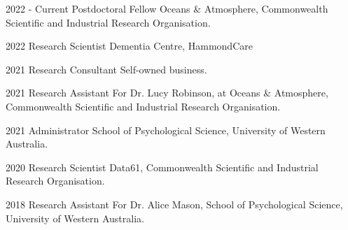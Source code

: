 

\begin{cvskills}
  \cvskill
    {2022 - Current} %
    {Postdoctoral Fellow} %
    {Oceans \& Atmosphere, Commonwealth Scientific and Industrial Research Organisation.} %

  \cvskill
    {2022} %
    {Research Scientist} %
    {Dementia Centre, HammondCare} %

  \cvskill
    {2021} %
    {Research Consultant} %
    {Self-owned business.} %

  \cvskill
    {2021} %
    {Research Assistant} %
    {For Dr. Lucy Robinson, at Oceans \& Atmosphere, Commonwealth Scientific and Industrial Research Organisation.} %

  \cvskill
    {2021} %
    {Administrator} %
    {School of Psychological Science, University of Western Australia.} %


  \cvskill
    {2020} %
    {Research Scientist} %
    {Data61, Commonwealth Scientific and Industrial Research Organisation.} %

  \cvskill
    {2018} %
    {Research Assistant} %
    {For Dr. Alice Mason, School of Psychological Science, University of Western Australia.} %

\end{cvskills}
